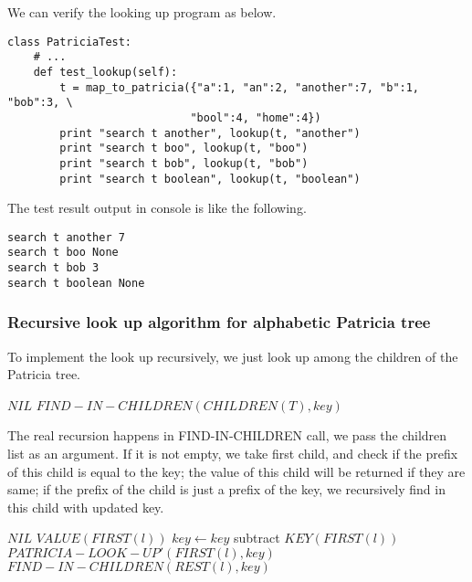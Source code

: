 \documentclass{article}
\begin{document}
We can verify the looking up program as below.

\begin{lstlisting}
class PatriciaTest:
    # ...
    def test_lookup(self):
        t = map_to_patricia({"a":1, "an":2, "another":7, "b":1, "bob":3, \
                            "bool":4, "home":4})
        print "search t another", lookup(t, "another")
        print "search t boo", lookup(t, "boo")
        print "search t bob", lookup(t, "bob")
        print "search t boolean", lookup(t, "boolean")
\end{lstlisting}

The test result output in console is like the following.

\begin{verbatim}
search t another 7
search t boo None
search t bob 3
search t boolean None
\end{verbatim}

\subsubsection{Recursive look up algorithm for alphabetic Patricia
tree}

To implement the look up recursively, we just look up among the children
of the Patricia tree.

\begin{algorithmic}[1]
    \State \Return $NIL$
  \Else
    \State \Return $FIND-IN-CHILDREN(CHILDREN(T), key)$
  \EndIf
\EndFunction
\end{algorithmic}

The real recursion happens in FIND-IN-CHILDREN call, we pass the
children list as an argument. If it is not empty, we take first child,
and check if the prefix of this child is equal to the key; the value
of this child will be returned if they are same; if the prefix of the
child is just a prefix of the key, we recursively find in this child
with updated key.

\begin{algorithmic}[1]
    \State \Return $NIL$
    \State \Return $VALUE(FIRST(l))$
    \State $key \leftarrow key$ subtract $KEY(FIRST(l))$
    \State \Return $PATRICIA-LOOK-UP'(FIRST(l), key)$
  \Else
    \State \Return $FIND-IN-CHILDREN(REST(l), key)$
  \EndIf
\EndFunction
\end{algorithmic}
\end{document}
